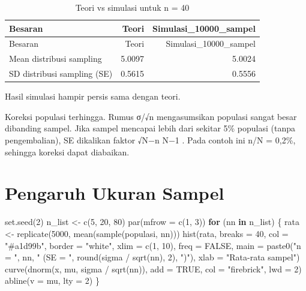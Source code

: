 \documentclass[
  indonesian,
  letterpaper,
]{book}
\newenvironment{Shaded}{\begin{snugshade}}{\end{snugshade}}
\newcommand{\AttributeTok}[1]{\textcolor[rgb]{0.40,0.45,0.13}{#1}}
\newcommand{\ConstantTok}[1]{\textcolor[rgb]{0.56,0.35,0.01}{#1}}
\newcommand{\ControlFlowTok}[1]{\textcolor[rgb]{0.00,0.23,0.31}{\textbf{#1}}}
\newcommand{\DecValTok}[1]{\textcolor[rgb]{0.68,0.00,0.00}{#1}}
\newcommand{\FunctionTok}[1]{\textcolor[rgb]{0.28,0.35,0.67}{#1}}
\newcommand{\NormalTok}[1]{\textcolor[rgb]{0.00,0.23,0.31}{#1}}
\newcommand{\OtherTok}[1]{\textcolor[rgb]{0.00,0.23,0.31}{#1}}
\newcommand{\SpecialCharTok}[1]{\textcolor[rgb]{0.37,0.37,0.37}{#1}}
\newcommand{\StringTok}[1]{\textcolor[rgb]{0.13,0.47,0.30}{#1}}
\begin{document}
\begin{longtable}[]{@{}lrr@{}}
\caption{Teori vs simulasi untuk n = 40}\tabularnewline
\toprule\noalign{}
Besaran & Teori & Simulasi\_10000\_sampel \\
\midrule\noalign{}
\endfirsthead
\toprule\noalign{}
Besaran & Teori & Simulasi\_10000\_sampel \\
\midrule\noalign{}
\endhead
\bottomrule\noalign{}
\endlastfoot
Mean distribusi sampling & 5.0097 & 5.0024 \\
SD distribusi sampling (SE) & 0.5615 & 0.5556 \\
\end{longtable}

Hasil simulasi hampir persis sama dengan teori.

Koreksi populasi terhingga. Rumus σ/√n mengasumsikan populasi sangat
besar dibanding sampel. Jika sampel mencapai lebih dari sekitar 5\%
populasi (tanpa pengembalian), SE dikalikan faktor √N−n N−1 . Pada
contoh ini n/N = 0,2\%, sehingga koreksi dapat diabaikan.

\section{Pengaruh Ukuran Sampel}\label{pengaruh-ukuran-sampel}

\begin{Shaded}
\begin{Highlighting}[]
\FunctionTok{set.seed}\NormalTok{(}\DecValTok{2}\NormalTok{)}
\NormalTok{n\_list }\OtherTok{\textless{}{-}} \FunctionTok{c}\NormalTok{(}\DecValTok{5}\NormalTok{, }\DecValTok{20}\NormalTok{, }\DecValTok{80}\NormalTok{)}
\FunctionTok{par}\NormalTok{(}\AttributeTok{mfrow =} \FunctionTok{c}\NormalTok{(}\DecValTok{1}\NormalTok{, }\DecValTok{3}\NormalTok{))}
\ControlFlowTok{for}\NormalTok{ (nn }\ControlFlowTok{in}\NormalTok{ n\_list) \{}
\NormalTok{rata }\OtherTok{\textless{}{-}} \FunctionTok{replicate}\NormalTok{(}\DecValTok{5000}\NormalTok{, }\FunctionTok{mean}\NormalTok{(}\FunctionTok{sample}\NormalTok{(populasi, nn)))}
\FunctionTok{hist}\NormalTok{(rata, }\AttributeTok{breaks =} \DecValTok{40}\NormalTok{, }\AttributeTok{col =} \StringTok{"\#a1d99b"}\NormalTok{, }\AttributeTok{border =} \StringTok{"white"}\NormalTok{, }\AttributeTok{xlim =} \FunctionTok{c}\NormalTok{(}\DecValTok{1}\NormalTok{, }\DecValTok{10}\NormalTok{), }\AttributeTok{freq =} \ConstantTok{FALSE}\NormalTok{,}
\AttributeTok{main =} \FunctionTok{paste0}\NormalTok{(}\StringTok{"n = "}\NormalTok{, nn, }\StringTok{" (SE = "}\NormalTok{, }\FunctionTok{round}\NormalTok{(sigma }\SpecialCharTok{/} \FunctionTok{sqrt}\NormalTok{(nn), }\DecValTok{2}\NormalTok{), }\StringTok{")"}\NormalTok{),}
\AttributeTok{xlab =} \StringTok{"Rata{-}rata sampel"}\NormalTok{)}
\FunctionTok{curve}\NormalTok{(}\FunctionTok{dnorm}\NormalTok{(x, mu, sigma }\SpecialCharTok{/} \FunctionTok{sqrt}\NormalTok{(nn)), }\AttributeTok{add =} \ConstantTok{TRUE}\NormalTok{, }\AttributeTok{col =} \StringTok{"firebrick"}\NormalTok{, }\AttributeTok{lwd =} \DecValTok{2}\NormalTok{)}
\FunctionTok{abline}\NormalTok{(}\AttributeTok{v =}\NormalTok{ mu, }\AttributeTok{lty =} \DecValTok{2}\NormalTok{)}
\NormalTok{\}}
\end{Highlighting}
\end{Shaded}
\end{document}
